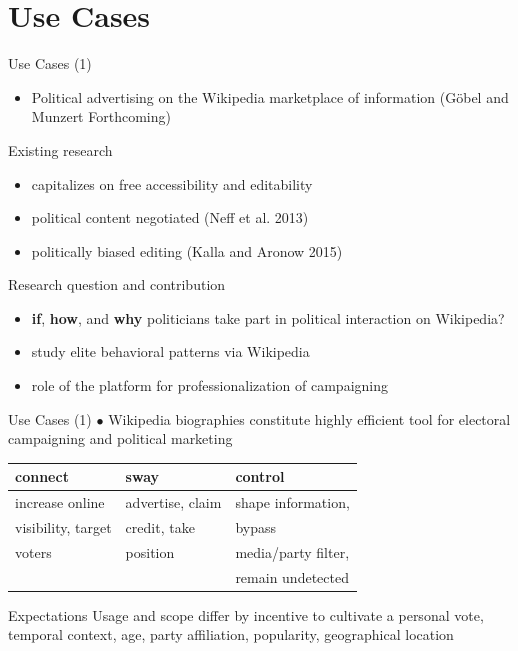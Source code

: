 \section{Use Cases}
\begin{frame}{Use Cases (1)}
\begin{itemize}
\item Political advertising on the Wikipedia marketplace of information (Göbel and Munzert Forthcoming)
\end{itemize}
\begin{block}{Existing research}
\begin{itemize}
	\item capitalizes on free accessibility and editability
	\item political content negotiated	(Neff et al. 2013)
	\item politically biased editing (Kalla and Aronow 2015)
\end{itemize}
\end{block}
\pause
\begin{block}{Research question and contribution}
\begin{itemize}
	\item \textbf{if}, \textbf{how}, and \textbf{why} politicians take part in political interaction on Wikipedia?
	\item study elite behavioral patterns via Wikipedia
	\item role of the platform for professionalization of campaigning
\end{itemize}
\end{block}
\end{frame}

\begin{frame}{Use Cases (1)}
$\bullet$ Wikipedia biographies constitute highly efficient tool for electoral campaigning and political marketing
\begin{table}[h]
  \centering
  \small
    \begin{tabularx}{\linewidth}{XXX}
    \hline
    connect & sway & control  \\
    \hline
    increase online & advertise, claim & shape information, \\
    visibility, target & credit, take & bypass \\ 
    voters & position & media/party filter, \\
    & & remain undetected \\
    \hline
    \end{tabularx}
%
\end{table}
\pause
\begin{block}{Expectations}
Usage and scope differ by incentive to cultivate a personal vote, temporal context, age, party affiliation, popularity, geographical location
%
\end{block}
\end{frame}



